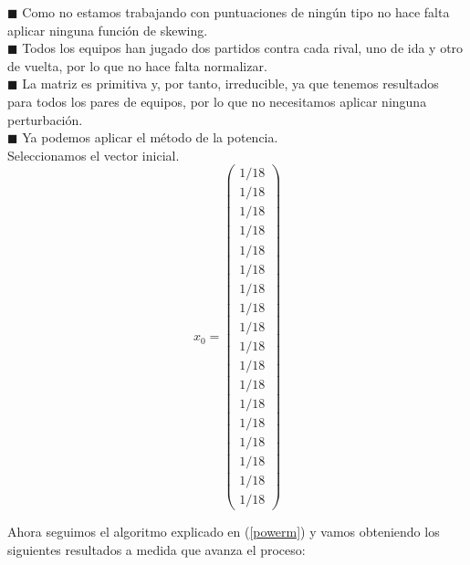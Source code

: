 	$\blacksquare $ Como no estamos trabajando con puntuaciones de ningún tipo no hace falta aplicar ninguna función de skewing.\\
	
	$\blacksquare $ Todos los equipos han jugado dos partidos contra cada rival, uno de ida y otro de vuelta, por lo que no hace falta normalizar.\\ 
	
	$\blacksquare $ La matriz es primitiva y, por tanto, irreducible, ya que tenemos resultados para todos los pares de equipos, por lo que no necesitamos aplicar ninguna perturbación.\\
	
	$\blacksquare $ Ya podemos aplicar el método de la potencia.\\
	
	
	Seleccionamos el vector inicial.
	\begin{equation*}
	x_{0} = 
	\left( \begin{array}{c}
	1/18\\
	1/18\\
	1/18\\
	1/18\\
	1/18\\
	1/18\\
	1/18\\
	1/18\\
	1/18\\
	1/18\\
	1/18\\
	1/18\\
	1/18\\
	1/18\\
	1/18\\
	1/18\\
	1/18\\
	1/18
	\end{array}\right) 
	\end{equation*}
	
	\newpage
	
	Ahora seguimos el algoritmo explicado en (\ref{powerm}) y vamos obteniendo los siguientes resultados a medida que avanza el proceso:
	
